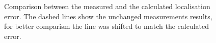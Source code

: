 \begin{figure}
\hfill
{}
	\caption{Comparison between the measured and the calculated localisation error. The dashed lines show the unchanged measurements results, for better comparism the line was shifted to match the calculated error.}
	\label{matchedFilter2}	
\end{figure}

